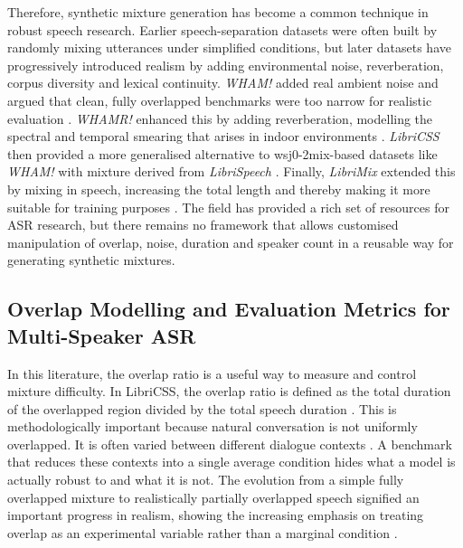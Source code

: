 Therefore, synthetic mixture generation has become a common technique in robust speech research. Earlier speech-separation datasets were often built by randomly mixing utterances under simplified conditions, but later datasets have progressively introduced realism by adding environmental noise, reverberation, corpus diversity and lexical continuity. \textit{WHAM!} added real ambient noise and argued that clean, fully overlapped benchmarks were too narrow for realistic evaluation \cite{wichern2019whamextendingspeechseparation}. \textit{WHAMR!} enhanced this by adding reverberation, modelling the spectral and temporal smearing that arises in indoor environments \cite{maciejewski2020whamrnoisyreverberantsinglechannel}. \textit{LibriCSS} then provided a more generalised alternative to wsj0-2mix-based datasets like \textit{WHAM!} with mixture derived from \textit{LibriSpeech} \cite{chen2020continuousspeechseparationdataset}. Finally, \textit{LibriMix} extended this by mixing in  speech, increasing the total length and thereby making it more suitable for training purposes \cite{cosentino2020librimixopensourcedatasetgeneralizable}. The field has provided a rich set of resources for ASR research, but there remains no framework that allows customised manipulation of overlap, noise, duration and speaker count in a reusable way for generating synthetic mixtures.

\subsection{Overlap Modelling and Evaluation Metrics for Multi-Speaker ASR}
In this literature, the overlap ratio is a useful way to measure and control mixture difficulty. In LibriCSS, the overlap ratio is defined as the total duration of the overlapped region divided by the total speech duration \cite{chen2020continuousspeechseparationdataset}. This is methodologically important because natural conversation is not uniformly overlapped. It is often varied between different dialogue contexts \cite{cetin06_interspeech}. A benchmark that reduces these contexts into a single average condition hides what a model is actually robust to and what it is not. The evolution from a simple fully overlapped mixture to realistically partially overlapped speech signified an important progress in realism, showing the increasing emphasis on treating overlap as an experimental variable rather than a marginal condition \cite{yang2022simulatingrealisticspeechoverlaps}.

